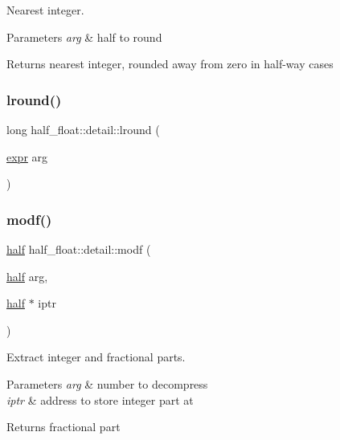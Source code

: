 Nearest integer. 
\begin{DoxyParams}{Parameters}
{\em arg} & half to round \\
\hline
\end{DoxyParams}
\begin{DoxyReturn}{Returns}
nearest integer, rounded away from zero in half-\/way cases 
\end{DoxyReturn}
\mbox{\label{namespacehalf__float_1_1detail_a6d1973ada01f199686cc173ea627052b}} 
\subsubsection{\texorpdfstring{lround()}{lround()}\hspace{0.1cm}{\footnotesize\ttfamily [2/2]}}
{\footnotesize\ttfamily long half\+\_\+float\+::detail\+::lround (\begin{DoxyParamCaption}\item[{\hyperlink{structhalf__float_1_1detail_1_1expr}{expr}}]{arg }\end{DoxyParamCaption})\hspace{0.3cm}{\ttfamily [inline]}}

\mbox{\label{namespacehalf__float_1_1detail_a5ec08b7eaba0159f189fedeaea43946e}} 
\subsubsection{\texorpdfstring{modf()}{modf()}\hspace{0.1cm}{\footnotesize\ttfamily [1/2]}}
{\footnotesize\ttfamily \hyperlink{classhalf__float_1_1half}{half} half\+\_\+float\+::detail\+::modf (\begin{DoxyParamCaption}\item[{\hyperlink{classhalf__float_1_1half}{half}}]{arg,  }\item[{\hyperlink{classhalf__float_1_1half}{half} $\ast$}]{iptr }\end{DoxyParamCaption})\hspace{0.3cm}{\ttfamily [inline]}}

Extract integer and fractional parts. 
\begin{DoxyParams}{Parameters}
{\em arg} & number to decompress \\
\hline
{\em iptr} & address to store integer part at \\
\hline
\end{DoxyParams}
\begin{DoxyReturn}{Returns}
fractional part 
\end{DoxyReturn}
\mbox{\label{namespacehalf__float_1_1detail_a86229873ef3805ed4ee0d8796a73b421}} 
